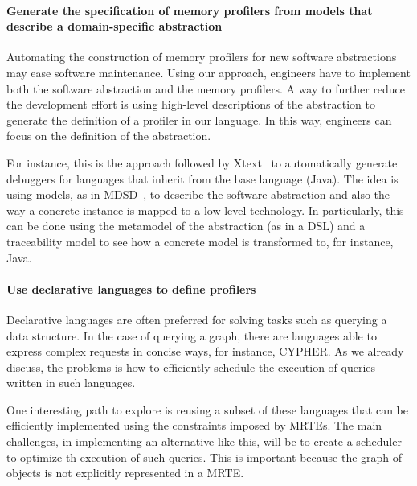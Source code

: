 \paragraph{Generate the specification of memory profilers from models that describe a domain-specific abstraction}
Automating the construction of memory profilers for new software abstractions may ease software maintenance.
Using our approach, engineers have to implement both the software abstraction and the memory profilers.
A way to further reduce the development effort is using high-level descriptions of the abstraction to generate the definition of a profiler in our language.
In this way, engineers can focus on the definition of the abstraction. 

For instance, this is the approach followed by Xtext~\cite{Eysholdt:2010:XIY:1869542.1869625} to automatically generate debuggers for languages that inherit from the base language (Java).
The idea is using models, as in \gls{MDSD}~\cite{Stahl:2006:MSD:1196766, Fowler:2010:DSL:1809745}, to describe the software abstraction and also the way a concrete instance is mapped to a low-level technology.
In particularly, this can be done using the metamodel of the abstraction (as in a DSL) and a traceability model to see how a concrete model is transformed to, for instance, Java.

\paragraph{Use declarative languages to define profilers}
Declarative languages are often preferred for solving tasks such as querying a data structure.
In the case of querying a graph, there are languages able to express complex requests in concise ways, for instance, CYPHER.
As we already discuss, the problems is how to efficiently schedule the execution of queries written in such languages.

One interesting path to explore is reusing a subset of these languages that can be efficiently implemented using the constraints imposed by MRTEs.
The main challenges, in implementing an alternative like this, will be to create a scheduler to optimize th execution of such queries.
This is important because the graph of objects is not explicitly represented in a MRTE.


